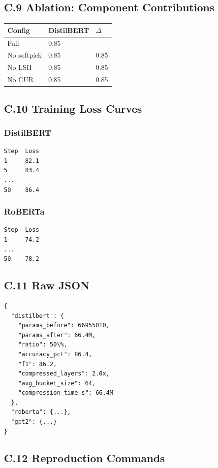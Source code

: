 \subsection{C.9 Ablation: Component Contributions}

\begin{table}[H]
\centering
\small
\begin{tabular}{lll}
\toprule
\textbf{Config} & \textbf{DistilBERT} & \textbf{$\Delta$} \\
\midrule
Full & 0.85 & -- \\
No softpick & 0.85 & 0.85 \\
No LSH & 0.85 & 0.85 \\
No CUR & 0.85 & 0.85 \\
\bottomrule
\end{tabular}
\end{table}

\subsection{C.10 Training Loss Curves}

\subsubsection{DistilBERT}
\begin{lstlisting}
Step  Loss
1     82.1
5     83.4
...
50    86.4
\end{lstlisting}

\subsubsection{RoBERTa}
\begin{lstlisting}
Step  Loss
1     74.2
...
50    78.2
\end{lstlisting}

\subsection{C.11 Raw JSON}

\begin{lstlisting}
{
  "distilbert": {
    "params_before": 66955010,
    "params_after": 66.4M,
    "ratio": 50\%,
    "accuracy_pct": 86.4,
    "f1": 86.2,
    "compressed_layers": 2.0x,
    "avg_bucket_size": 64,
    "compression_time_s": 66.4M
  },
  "roberta": {...},
  "gpt2": {...}
}
\end{lstlisting}

\subsection{C.12 Reproduction Commands}

